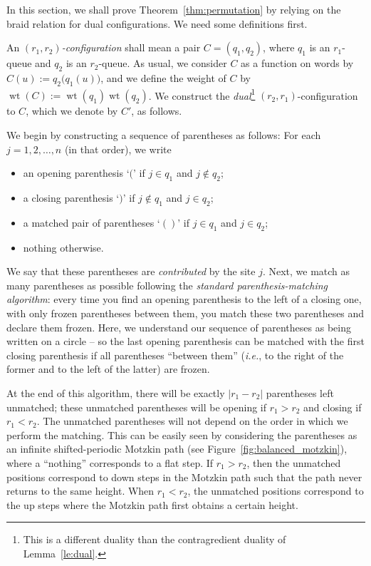 \documentclass[reqno]{amsart}
\newcommand{\0}{\phantom{c}}
\DeclareMathOperator{\wt}{wt} %
\newcommand{\abs}[1]{\left| #1 \right|}
\newcommand{\defn}[1]{{\color{darkred}\emph{#1}}} %
\theoremstyle{plain}
\theoremstyle{definition}
\numberwithin{equation}{section}
\begin{document}
In this section, we shall prove Theorem~\ref{thm:permutation} by relying on the
braid relation for dual configurations. We need some definitions first.

An \defn{$(r_1,r_2)$-configuration} shall mean a pair $C = (q_1, q_2)$, where $q_1$ is an $r_1$-queue and $q_2$ is an $r_2$-queue.
As usual, we consider $C$ as a function on words by $C(u) := q_2\bigr(q_1(u)\bigr)$, and we define the weight of $C$ by $\wt(C) := \wt(q_1) \wt(q_2)$.
We construct the \defn{dual}\footnote{This is a different duality than the contragredient duality of Lemma~\ref{le:dual}.} $(r_2,r_1)$-configuration to $C$, which we denote by $C'$, as follows.

We begin by constructing a sequence of parentheses as follows: For each $j = 1, 2, \dotsc, n$ (in that order), we write
\begin{itemize}
\item an opening parenthesis `$($' if $j \in q_1$ and $j \notin q_2$;
\item a closing parenthesis `$)$' if $j \notin q_1$ and $j \in q_2$;
\item a matched pair of parentheses `$()$' if $j \in q_1$ and $j \in q_2$;
\item nothing otherwise.
\end{itemize}
We say that these parentheses are \defn{contributed} by the site $j$.
Next, we match as many parentheses as possible following the \defn{standard parenthesis-matching algorithm}:
every time you find an opening parenthesis to the left of a closing one, with only frozen parentheses between them, you match these two parentheses and declare them frozen.
Here, we understand our sequence of parentheses as being written on a circle -- so the last opening parenthesis can be matched with the first closing parenthesis if all parentheses ``between them'' (\textit{i.e.}, to the right of the former and to the left of the latter) are frozen.

At the end of this algorithm, there will be exactly $\abs{r_1 - r_2}$ parentheses left unmatched; these unmatched parentheses will be opening if $r_1 > r_2$ and closing if $r_1 < r_2$. The unmatched parentheses will not depend on the order in which we perform the matching.
This can be easily seen by considering the parentheses as an infinite shifted-periodic Motzkin path (see Figure~\ref{fig:balanced_motzkin}), where a ``nothing'' corresponds to a flat step.
If $r_1 > r_2$, then the unmatched positions correspond to down steps in the Motzkin path such that the path never returns to the same height.
When $r_1 < r_2$, the unmatched positions correspond to the up steps where the Motzkin path first obtains a certain height.
\end{document}
